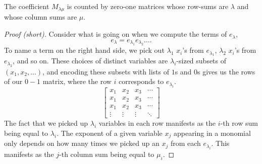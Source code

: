 \documentclass{article}
\begin{document}
\begin{theorem} \label{thm:e2mCombInterpretation}
    The coefficient $M_{\lambda\mu}$ is counted by zero-one matrices whose row-sums are $\lambda$ and whose column sums are $\mu$.
\end{theorem}

\begin{proof}[Proof (short)]
    Consider what is going on when we compute the terms of $e_\lambda$,
    \[
        e_\lambda = e_{\lambda_1}e_{\lambda_2}\ldots.
    \]
    To name a term on the right hand side, we pick out $\lambda_1$ $x_i$'s from $e_{\lambda_1}$, $\lambda_2$ $x_i$'s from $e_{\lambda_2}$, and so on.
    These choices of distinct variables are $\lambda_i$-sized subsets of $(x_1, x_2, \ldots)$, and encoding these subsets with lists of $1$s and $0$s gives us the rows of our $0-1$ matrix, where the row $i$ corresponds to $e_{\lambda_i}$.     
    \[
        \begin{bmatrix}
            x_1 & x_2 & x_3 & \cdots \\
            x_1 & x_2 & x_3 & \cdots \\
            x_1 & x_2 & x_3 & \cdots \\
            \vdots & \vdots & \vdots & \ddots 
        \end{bmatrix}
    \]
    The fact that we picked up $\lambda_i$ variables in each row manifests as the $i$-th row sum being equal to $\lambda_i$.
The exponent of a given variable $x_j$ appearing in a monomial only depends on how many times we picked up an $x_j$ from each $e_{\lambda_i}$. 
This manifests as the $j$-th column sum being equal to $\mu_i$.
\end{proof}
\end{document}
